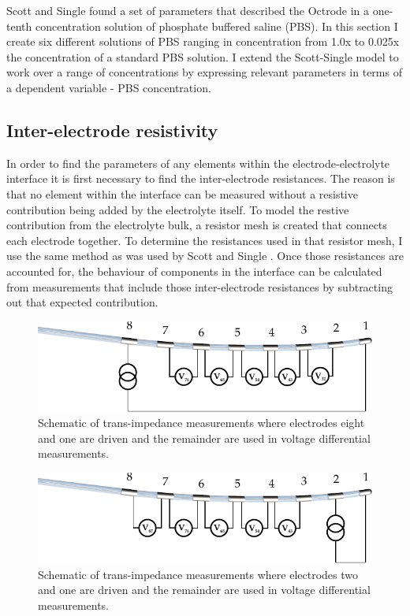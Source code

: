   Scott and Single found a set of parameters that described the Octrode in a one-tenth concentration solution of phosphate buffered saline (PBS).
  In this section I create six different solutions of PBS ranging in concentration from 1.0x to 0.025x the concentration of a standard PBS solution.
  I extend the Scott-Single model to work over a range of concentrations by expressing relevant parameters in terms of a dependent variable - PBS concentration.

  \subsection{Inter-electrode resistivity}


    In order to find the parameters of any elements within the electrode-electrolyte interface it is first necessary to find the inter-electrode resistances.
    The reason is that no element within the interface can be measured without a resistive contribution being added by the electrolyte itself.
    To model the restive contribution from the electrolyte bulk, a resistor mesh is created that connects each electrode together.
    To determine the resistances used in that resistor mesh, I use the same method as was used by Scott and Single \cite{Scott2014}.
    Once those resistances are accounted for, the behaviour of components in the interface can be calculated from measurements that include those inter-electrode resistances by subtracting out that expected contribution.

    \begin{figure}
      \centering
      \includegraphics{content/pt2/07-InterfaceModel/graphics/TransimpedanceMeasurements_Stim81}
      \caption{\label{fig:pt2-transimpedanceMeasurementDiagram_81Stim}Schematic of trans-impedance measurements where electrodes eight and one are driven and the remainder are used in voltage differential measurements.}
    \end{figure}

    \begin{figure}
      \centering
      \includegraphics{content/pt2/07-InterfaceModel/graphics/TransimpedanceMeasurements_Stim21}
      \caption{\label{fig:pt2-transimpedanceMeasurementDiagram_21Stim}Schematic of trans-impedance measurements where electrodes two and one are driven and the remainder are used in voltage differential measurements.}
    \end{figure}

